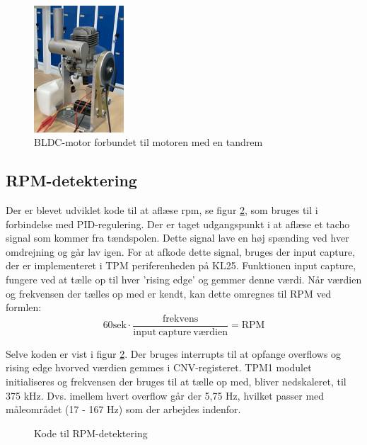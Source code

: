 \begin{figure}[h]
  \centering
  \includegraphics[width=0.3\textwidth]{./figurer/mots6.png}
  \caption{BLDC-motor forbundet til motoren med en tandrem}
  \label{fig:mots6}
\end{figure}
\clearpage
\subsection{RPM-detektering}
\label{sec:rpm-detektering}

Der er blevet udviklet kode til at aflæse rpm, se figur \ref{fig:kodes3}, som bruges til i forbindelse med PID-regulering. Der er taget udgangspunkt i at aflæse et tacho signal som kommer fra tændspolen. Dette signal lave en høj spænding ved hver omdrejning og går lav igen. For at afkode dette signal, bruges der input capture, der er implementeret i TPM periferenheden på KL25. Funktionen input capture, fungere ved at tælle op til hver ’rising edge’ og gemmer denne værdi. Når værdien og frekvensen der tælles op med er kendt, kan dette omregnes til RPM ved formlen:
\begin{equation}
  \label{eq:4}
 60 \mathrm{sek} \cdot \frac{\mathrm{frekvens}}{\mathrm{input\ capture\ værdien}}=\mathrm{RPM} 
\end{equation}

Selve koden er vist i figur \ref{fig:kodes3}. Der bruges interrupts til at opfange overflows og rising edge hvorved værdien gemmes i CNV-registeret. TPM1 modulet initialiseres og frekvensen der bruges til at tælle op med, bliver nedskaleret, til 375 kHz. Dvs. imellem hvert overflow går der 5,75 Hz, hvilket passer med måleområdet (17 - 167 Hz) som der arbejdes indenfor.

\begin{figure}[h]
  \centering
    
  \caption{Kode til RPM-detektering}
  \label{fig:kodes3}
\end{figure}


